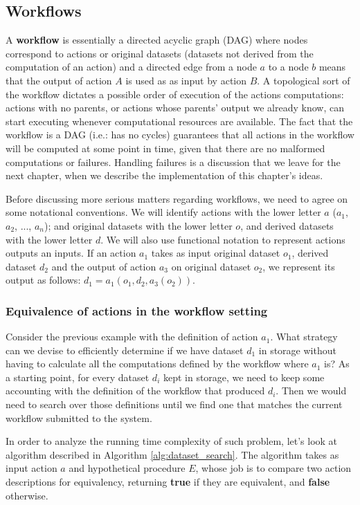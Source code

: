 \subsection{Workflows}
A \textbf{workflow} is essentially a directed acyclic graph (DAG) where nodes correspond to actions or original datasets (datasets not derived from the computation of an action) and a directed edge from a node $a$ to a node $b$ means that the output of action $A$ is used as as input by action $B$.  A topological sort of the workflow dictates a possible order of execution of the actions computations: actions with no parents, or actions whose parents' output we already know, can start executing whenever computational resources are available. The fact that the workflow is a DAG (i.e.: has no cycles) guarantees that all actions in the workflow will be computed at some point in time, given that there are no malformed computations or failures.  Handling failures is a discussion that we leave for the next chapter, when we describe the implementation of this chapter's ideas.

Before discussing more serious matters regarding workflows, we need to agree on some notational conventions.  We will identify actions with the lower letter $a$ ($a_1$, $a_2$, ..., $a_n$); and original datasets with the lower letter $o$, and derived datasets with the lower letter $d$.  We will also use functional notation to represent actions outputs an inputs.  If an action $a_1$ takes as input original dataset $o_1$, derived dataset $d_2$ and the output of action $a_3$ on original dataset $o_2$, we represent its output as follows: $d_1 = a_1(o_1, d_2, a_3(o_2))$.

\subsubsection{Equivalence of actions in the workflow setting}
Consider the previous example with the definition of action $a_1$. What strategy can we devise to efficiently determine if we have dataset $d_1$ in storage without having to calculate all the computations defined by the workflow where $a_1$ is? As a starting point, for every dataset $d_i$ kept in storage, we need to keep some accounting with the definition of the workflow that produced $d_i$.  Then we would need to search over those definitions until we find one that matches the current workflow submitted to the system.  

In order to analyze the running time complexity of such problem, let's look at algorithm described in Algorithm \ref{alg:dataset_search}. The algorithm takes as input action $a$ and hypothetical procedure $E$, whose job is to compare two action descriptions for equivalency, returning \textbf{true} if they are equivalent, and \textbf{false} otherwise.


